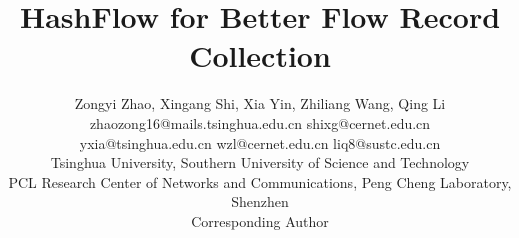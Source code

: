\documentclass[10pt, conference, letterpaper]{IEEEtran}
\begin{document}
\title{HashFlow  for Better Flow Record Collection}
\author{Zongyi Zhao, Xingang Shi, Xia Yin, Zhiliang Wang, Qing Li\\ zhaozong16@mails.tsinghua.edu.cn shixg@cernet.edu.cn \\
	yxia@tsinghua.edu.cn wzl@cernet.edu.cn liq8@sustc.edu.cn\\ 
	Tsinghua University, Southern University of Science and Technology\\ PCL Research Center of Networks and Communications, Peng Cheng Laboratory, Shenzhen\\ Corresponding Author}
\maketitle






%



%

\end{document}
